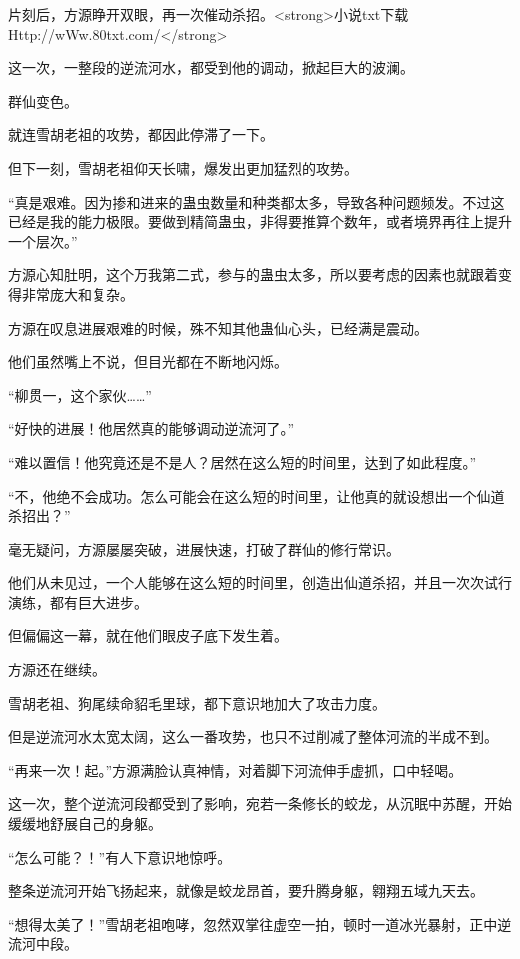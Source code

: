 
\begin{this_body}

片刻后，方源睁开双眼，再一次催动杀招。<strong>小说txt下载Http://wWw.80txt.com/</strong>

这一次，一整段的逆流河水，都受到他的调动，掀起巨大的波澜。

群仙变色。

就连雪胡老祖的攻势，都因此停滞了一下。

但下一刻，雪胡老祖仰天长啸，爆发出更加猛烈的攻势。

“真是艰难。因为掺和进来的蛊虫数量和种类都太多，导致各种问题频发。不过这已经是我的能力极限。要做到精简蛊虫，非得要推算个数年，或者境界再往上提升一个层次。”

方源心知肚明，这个万我第二式，参与的蛊虫太多，所以要考虑的因素也就跟着变得非常庞大和复杂。

方源在叹息进展艰难的时候，殊不知其他蛊仙心头，已经满是震动。

他们虽然嘴上不说，但目光都在不断地闪烁。

“柳贯一，这个家伙……”

“好快的进展！他居然真的能够调动逆流河了。”

“难以置信！他究竟还是不是人？居然在这么短的时间里，达到了如此程度。”

“不，他绝不会成功。怎么可能会在这么短的时间里，让他真的就设想出一个仙道杀招出？”

毫无疑问，方源屡屡突破，进展快速，打破了群仙的修行常识。

他们从未见过，一个人能够在这么短的时间里，创造出仙道杀招，并且一次次试行演练，都有巨大进步。

但偏偏这一幕，就在他们眼皮子底下发生着。

方源还在继续。

雪胡老祖、狗尾续命貂毛里球，都下意识地加大了攻击力度。

但是逆流河水太宽太阔，这么一番攻势，也只不过削减了整体河流的半成不到。

“再来一次！起。”方源满脸认真神情，对着脚下河流伸手虚抓，口中轻喝。

这一次，整个逆流河段都受到了影响，宛若一条修长的蛟龙，从沉眠中苏醒，开始缓缓地舒展自己的身躯。

“怎么可能？！”有人下意识地惊呼。

整条逆流河开始飞扬起来，就像是蛟龙昂首，要升腾身躯，翱翔五域九天去。

“想得太美了！”雪胡老祖咆哮，忽然双掌往虚空一拍，顿时一道冰光暴射，正中逆流河中段。


\end{this_body}
